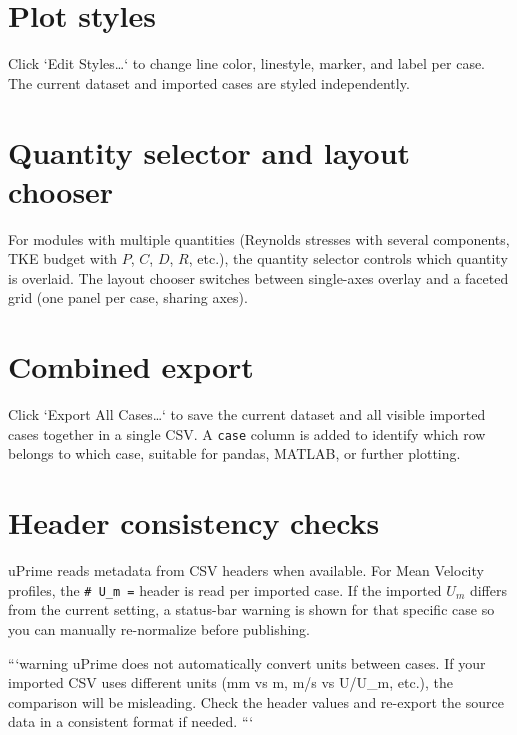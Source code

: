 \section{Plot styles}

Click `Edit Styles\ldots` to change line color, linestyle, marker, and label per case. The current dataset and imported cases are styled independently.

\section{Quantity selector and layout chooser}

For modules with multiple quantities (Reynolds stresses with several components, TKE budget with $P$, $C$, $D$, $R$, etc.), the quantity selector controls which quantity is overlaid. The layout chooser switches between single-axes overlay and a faceted grid (one panel per case, sharing axes).

\section{Combined export}

Click `Export All Cases\ldots` to save the current dataset and all visible imported cases together in a single CSV. A \texttt{case} column is added to identify which row belongs to which case, suitable for pandas, MATLAB, or further plotting.

\section{Header consistency checks}

uPrime reads metadata from CSV headers when available. For Mean Velocity profiles, the \texttt{\# U\_m =} header is read per imported case. If the imported $U_m$ differs from the current setting, a status-bar warning is shown for that specific case so you can manually re-normalize before publishing.

```{warning}
uPrime does not automatically convert units between cases. If your imported CSV uses different units (mm vs m, m/s vs U/U\_m, etc.), the comparison will be misleading. Check the header values and re-export the source data in a consistent format if needed.
```

